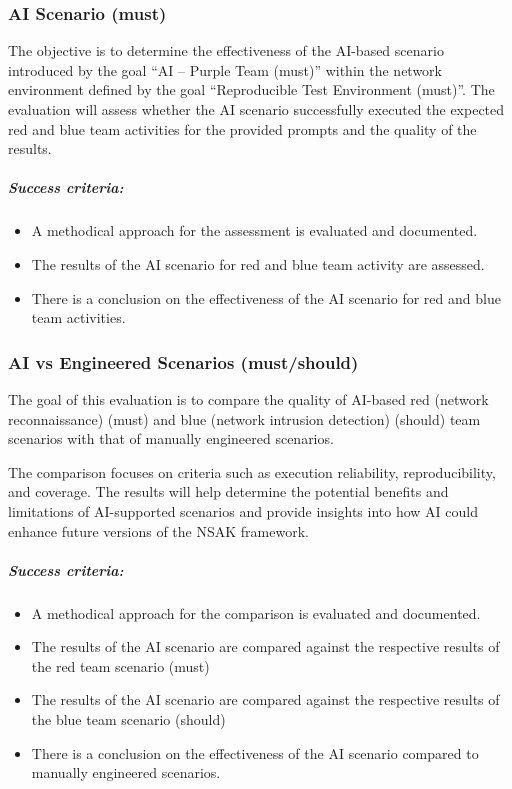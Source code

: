 \subsubsection{AI Scenario (must)}

The objective is to determine the effectiveness of the AI-based scenario introduced by the goal ``AI -- Purple Team (must)'' within the network environment defined by the goal ``Reproducible Test Environment (must)''. The evaluation will assess whether the AI scenario successfully executed the expected red and blue team activities for the provided prompts and the quality of the results.

\subparagraph{Success criteria:}

\begin{itemize}
	\item A methodical approach for the assessment is evaluated and documented.
	\item The results of the AI scenario for red and blue team activity are assessed.
	\item There is a conclusion on the effectiveness of the AI scenario for red and blue team activities.
\end{itemize}


\subsubsection{AI vs Engineered Scenarios (must/should)}

The goal of this evaluation is to compare the quality of AI-based red (network reconnaissance) (must) and blue (network intrusion detection) (should) team scenarios with that of manually engineered scenarios.

The comparison focuses on criteria such as execution reliability, reproducibility, and coverage. The results will help determine the potential benefits and limitations of AI-supported scenarios and provide insights into how AI could enhance future versions of the NSAK framework.

\subparagraph{Success criteria:}

\begin{itemize}
	\item A methodical approach for the comparison is evaluated and documented.
	\item The results of the AI scenario are compared against the respective results of the red team scenario (must)
	\item The results of the AI scenario are compared against the respective results of the blue team scenario (should)
	\item There is a conclusion on the effectiveness of the AI scenario compared to manually engineered scenarios.
\end{itemize}